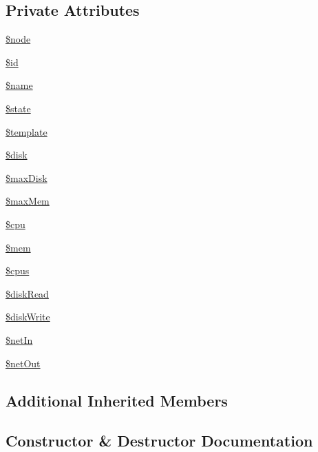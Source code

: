 \subsection*{Private Attributes}
\begin{DoxyCompactItemize}
\item 
\hyperlink{class_proxmox_node_v_m_a15955933e72700564e1a76d7f97c1ac7}{\$node}
\item 
\hyperlink{class_proxmox_node_v_m_ae97941710d863131c700f069b109991e}{\$id}
\item 
\hyperlink{class_proxmox_node_v_m_ab2fc40d43824ea3e1ce5d86dee0d763b}{\$name}
\item 
\hyperlink{class_proxmox_node_v_m_ae82306c4f2d17d8dd5c7d8d916b33bed}{\$state}
\item 
\hyperlink{class_proxmox_node_v_m_aa3e9534005fd516d941f6a5569896e01}{\$template}
\item 
\hyperlink{class_proxmox_node_v_m_acc7576104b0e495760ab939e6defe72b}{\$disk}
\item 
\hyperlink{class_proxmox_node_v_m_ab1f41a8d0cf27e45f183618b663fbf06}{\$max\+Disk}
\item 
\hyperlink{class_proxmox_node_v_m_abc95a089e449295ed173281588cdfe99}{\$max\+Mem}
\item 
\hyperlink{class_proxmox_node_v_m_aa784f061de7027a205abe9efcea3f4bb}{\$cpu}
\item 
\hyperlink{class_proxmox_node_v_m_a8e3496925e682c8e4155ad720f98fb8d}{\$mem}
\item 
\hyperlink{class_proxmox_node_v_m_a374bb274ed14819814df042e6f5caaa5}{\$cpus}
\item 
\hyperlink{class_proxmox_node_v_m_ab4a41e576073383ca2ea4e44c898b915}{\$disk\+Read}
\item 
\hyperlink{class_proxmox_node_v_m_afe27406f349004e33b25d0f6830b1e50}{\$disk\+Write}
\item 
\hyperlink{class_proxmox_node_v_m_a716eae9ccb5bdc2b06b30be22880f7e0}{\$net\+In}
\item 
\hyperlink{class_proxmox_node_v_m_aff4929d078999d8a0be2a4e42c024734}{\$net\+Out}
\end{DoxyCompactItemize}
\subsection*{Additional Inherited Members}


\subsection{Constructor \& Destructor Documentation}
\hypertarget{class_proxmox_node_v_m_a31741cf150e7a0f2664d4e33328be1e8}{}
